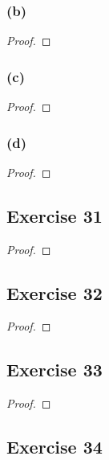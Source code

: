 \documentclass[14pt]{extarticle}
\begin{document}
\subsubsection{(b)}

\begin{proof}

\end{proof}

\subsubsection{(c)}

\begin{proof}

\end{proof}

\subsubsection{(d)}

\begin{proof}

\end{proof}

\subsection{Exercise 31}

\begin{proof}

\end{proof}

\subsection{Exercise 32}

\begin{proof}

\end{proof}

\subsection{Exercise 33}

\begin{proof}

\end{proof}

\subsection{Exercise 34}
\end{document}
